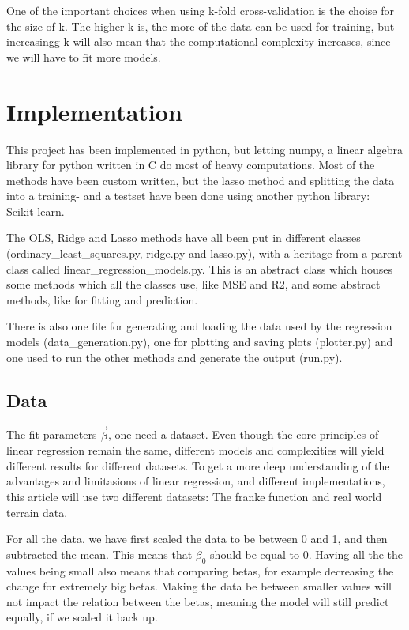 \documentclass[12pt]{article}
\newcommand{\bbeta}{\vec{\beta}}
\begin{document}
One of the important choices when using k-fold cross-validation is the choise for the size of k.
The higher k is, the more of the data can be used for training, but increasingg k will also mean that the computational complexity increases, since we will have to fit more models.



\section{Implementation}

This project has been implemented in python, but letting numpy, a linear algebra library for python written in C do most of heavy computations.
Most of the methods have been custom written, but the lasso method and splitting the data into a training- and a testset have been done using another python library: Scikit-learn.

The OLS, Ridge and Lasso methods have all been put in different classes (ordinary\_least\_squares.py, ridge.py and lasso.py), with a heritage from a parent class called linear\_regression\_models.py.
This is an abstract class which houses some methods which all the classes use, like MSE and R2, and some abstract methods, like for fitting and prediction.

There is also one file for generating and loading the data used by the regression models (data\_generation.py), one for plotting and saving plots (plotter.py) and one used to run the other methods and generate the output (run.py).

\subsection{Data}


The fit parameters $\bbeta$, one need a dataset.
Even though the core principles of linear regression remain the same, different models and complexities will yield different results for different datasets.
To get a more deep understanding of the advantages and limitasions of linear regression, and different implementations, this article will use two different datasets: The franke function and real world terrain data.

For all the data, we have first scaled the data to be between 0 and 1, and then subtracted the mean.
This means that $\beta_0$ should be equal to $0$.
Having all the the values being small also means that comparing betas, for example decreasing the change for extremely big betas.
Making the data be between smaller values will not impact the relation between the betas, meaning the model will still predict equally, if we scaled it back up.
\end{document}
